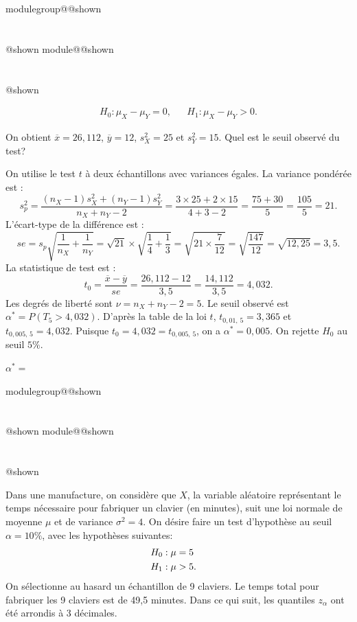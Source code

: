 \documentclass{Evaluation}
\makeatletter
\newcommand{\currentmodulekey}{}
\newcommand{\currentmoduletitle}{}
\newcommand{\currentgroupkey}{}
\newcommand{\currentgrouptitle}{}
\newcommand{\showmoduleifneeded}{%
  \ifx\currentgroupkey\empty\else
    \expandafter\ifx\csname modulegroup@\currentgroupkey @shown\endcsname\relax
      \section*{\currentgrouptitle}%
      \expandafter\gdef\csname modulegroup@\currentgroupkey @shown\endcsname{1}%
    \fi
  \fi
  \expandafter\ifx\csname module@\currentmodulekey @shown\endcsname\relax
    \section*{\currentmoduletitle}%
    \expandafter\gdef\csname module@\currentmodulekey @shown\endcsname{1}%
  \fi
}
\newenvironment{A23}{\showmoduleifneeded}{}
\newenvironment{H26}{\showmoduleifneeded}{}
\makeatother
\begin{document}
\begin{questions}
\begin{H26}
\begin{align*}
    H_0:\mu_X-\mu_Y=0, & & H_1:\mu_X-\mu_Y>0.
\end{align*}

On obtient $\overline{x}=26,112$, $\overline{y}=12$, $s_X^2=25$ et $s_Y^2=15$. Quel est le seuil observé du test?

\begin{solution}
On utilise le test $t$ à deux échantillons avec variances égales. La variance pondérée est :
$$s_p^2=\frac{(n_X-1)s_X^2+(n_Y-1)s_Y^2}{n_X+n_Y-2}=\frac{3\times 25+2\times 15}{4+3-2}=\frac{75+30}{5}=\frac{105}{5}=21.$$
L'écart-type de la différence est :
$$se=s_p\sqrt{\frac{1}{n_X}+\frac{1}{n_Y}}=\sqrt{21}\times\sqrt{\frac{1}{4}+\frac{1}{3}}=\sqrt{21\times\frac{7}{12}}=\sqrt{\frac{147}{12}}=\sqrt{12{,}25}=3{,}5.$$
La statistique de test est :
$$t_0=\frac{\overline{x}-\overline{y}}{se}=\frac{26{,}112-12}{3{,}5}=\frac{14{,}112}{3{,}5}=4{,}032.$$
Les degrés de liberté sont $\nu=n_X+n_Y-2=5$. Le seuil observé est $\alpha^*=P(T_5>4{,}032)$. D'après la table de la loi $t$, $t_{0{,}01,\,5}=3{,}365$ et $t_{0{,}005,\,5}=4{,}032$. Puisque $t_0=4{,}032=t_{0{,}005,\,5}$, on a $\alpha^*=0{,}005$. On rejette $H_0$ au seuil $5\%$.
\end{solution}

$\alpha^*=$
\end{H26}

\begin{A23}
\question {} %
Dans une manufacture, on considère que $X$, la variable aléatoire représentant le temps nécessaire pour fabriquer un clavier (en minutes), suit une loi normale de moyenne $\mu$ et de variance $\sigma^2=4$. On désire faire un test d'hypothèse au seuil $\alpha=10\%$, avec les hypothèses suivantes:
\begin{align*}
	H_0&: \mu=5\cr
	H_1&: \mu > 5.
\end{align*}
On sélectionne au hasard un échantillon de 9 claviers. Le temps total pour fabriquer les 9 claviers est de 49,5 minutes. Dans ce qui suit, les quantiles $z_\alpha$ ont été arrondis à 3 décimales.

\begin{center}


\end{center}
\end{A23}
\end{questions}
\end{document}
